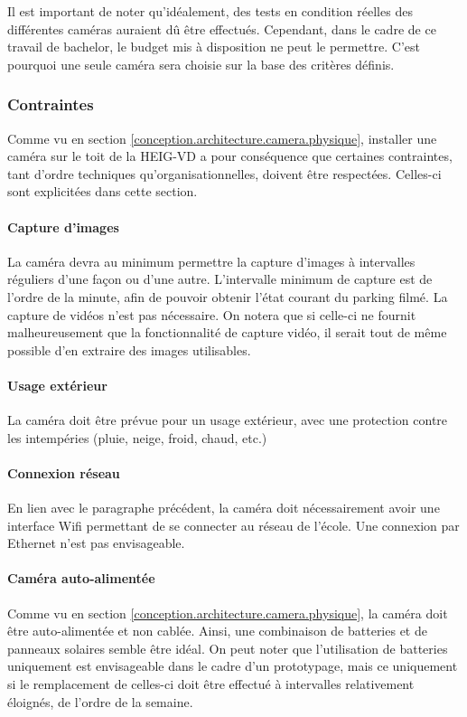 Il est important de noter qu'idéalement, des tests en condition réelles des différentes caméras auraient dû être effectués. Cependant, dans le cadre de ce travail de bachelor, le budget mis à disposition ne peut le permettre. C'est pourquoi une seule caméra sera choisie sur la base des critères définis.

\subsubsection{Contraintes}\label{conception.techno.camera.contraintes}
Comme vu en section \ref{conception.architecture.camera.physique}, installer une caméra sur le toit de la HEIG-VD a pour conséquence que certaines contraintes, tant d'ordre techniques qu'organisationnelles, doivent être respectées. Celles-ci sont explicitées dans cette section.

\paragraph{Capture d'images}
La caméra devra au minimum permettre la capture d'images à intervalles réguliers d'une façon ou d'une autre. L'intervalle minimum de capture est de l'ordre de la minute, afin de pouvoir obtenir l'état courant du parking filmé. La capture de vidéos n'est pas nécessaire. On notera que si celle-ci ne fournit malheureusement que la fonctionnalité de capture vidéo, il serait tout de même possible d'en extraire des images utilisables. 

\paragraph{Usage extérieur}
La caméra doit être prévue pour un usage extérieur, avec une protection contre les intempéries (pluie, neige, froid, chaud, etc.)

\paragraph{Connexion réseau}
En lien avec le paragraphe précédent, la caméra doit nécessairement avoir une interface Wifi permettant de se connecter au réseau de l'école. Une connexion par Ethernet n'est pas envisageable.

\paragraph{Caméra auto-alimentée}
Comme vu en section \ref{conception.architecture.camera.physique}, la caméra doit être auto-alimentée et non cablée. Ainsi, une combinaison de batteries et de panneaux solaires semble être idéal. On peut noter que l'utilisation de batteries uniquement est envisageable dans le cadre d'un prototypage, mais ce uniquement si le remplacement de celles-ci doit être effectué à intervalles relativement éloignés, de l'ordre de la semaine.

